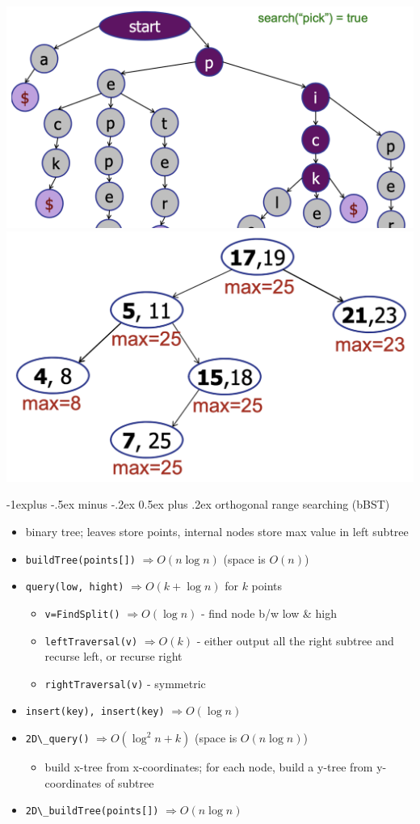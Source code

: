 \documentclass[10pt, landscape]{article}
\makeatletter
\let\Then\Rightarrow
\newcommand{\code}[1]{\colorbox{gray!25!}{\lstinline|#1|}}
\renewcommand{\subsection}{\@startsection{subsection}{2}{0.1mm}%
                                {-1explus -.5ex minus -.2ex}%
                                {0.5ex plus .2ex}%
                                {\normalfont\normalsize\bfseries}}
\makeatother
\begin{document}
\begin{multicols}{4}
\includegraphics[width=0.5\linewidth]{cs2040s-trie.png}
\includegraphics[width=0.45\linewidth]{cs2040s-interval-tree.png}

\subsection{orthogonal range searching (bBST)}
\begin{itemize}
    \item binary tree; leaves store points, internal nodes store max value in left subtree
    \item \code{buildTree(points[])} $\Then O(n \log n)$ \quad (space is $O(n)$)
    \item \code{query(low, hight)} $\Then O(k + \log n)$ for $k$ points
    \begin{itemize}
        \item \code{v=FindSplit()} $\Then O(\log n)$ - find node b/w low \& high
        \item \code{leftTraversal(v)} $\Then O(k)$ - either output all the right subtree and recurse left, or recurse right 
        \item \code{rightTraversal(v)} - symmetric
    \end{itemize}
    \item \code{insert(key), insert(key)} $\Then O(\log n)$ 
    \item \code{2D\_query()} $\Then O(\log^2n + k)$ \quad (space is $O(n \log n)$)
    \begin{itemize}
        \item build x-tree from x-coordinates; for each node, build a y-tree from y-coordinates of subtree
    \end{itemize}
    \item \code{2D\_buildTree(points[])} $\Then O(n \log n)$
\end{itemize}


\end{multicols}
\end{document}
